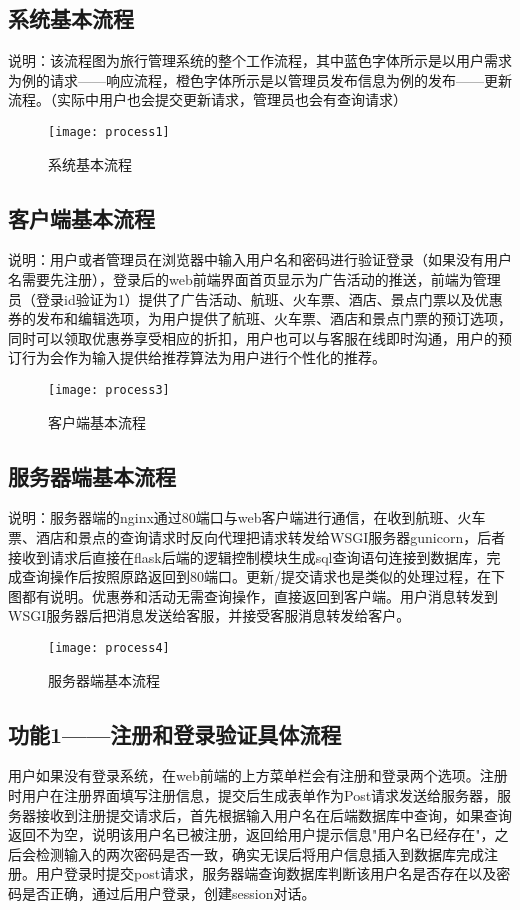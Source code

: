 \subsection{系统基本流程}
说明：该流程图为旅行管理系统的整个工作流程，其中蓝色字体所示是以用户需求为例的请求——响应流程，橙色字体所示是以管理员发布信息为例的发布——更新流程。（实际中用户也会提交更新请求，管理员也会有查询请求）
\newpage

\begin{figure}[htbp]
\texttt{[image: process1]}
\caption{系统基本流程} \label{fig:figure1}
\end{figure}

\subsection{客户端基本流程}
说明：用户或者管理员在浏览器中输入用户名和密码进行验证登录（如果没有用户名需要先注册），登录后的web前端界面首页显示为广告活动的推送，前端为管理员（登录id验证为1）提供了广告活动、航班、火车票、酒店、景点门票以及优惠券的发布和编辑选项，为用户提供了航班、火车票、酒店和景点门票的预订选项，同时可以领取优惠券享受相应的折扣，用户也可以与客服在线即时沟通，用户的预订行为会作为输入提供给推荐算法为用户进行个性化的推荐。
\begin{figure}[htbp]
\texttt{[image: process3]}
\caption{客户端基本流程} \label{fig:figure3}
\end{figure}

\subsection{服务器端基本流程}
说明：服务器端的nginx通过80端口与web客户端进行通信，在收到航班、火车票、酒店和景点的查询请求时反向代理把请求转发给WSGI服务器gunicorn，后者接收到请求后直接在flask后端的逻辑控制模块生成sql查询语句连接到数据库，完成查询操作后按照原路返回到80端口。更新/提交请求也是类似的处理过程，在下图都有说明。优惠券和活动无需查询操作，直接返回到客户端。用户消息转发到WSGI服务器后把消息发送给客服，并接受客服消息转发给客户。

\begin{figure}[htbp]
\texttt{[image: process4]}
\caption{服务器端基本流程} \label{fig:figure4}
\end{figure}

\subsection{功能1——注册和登录验证具体流程}
用户如果没有登录系统，在web前端的上方菜单栏会有注册和登录两个选项。注册时用户在注册界面填写注册信息，提交后生成表单作为Post请求发送给服务器，服务器接收到注册提交请求后，首先根据输入用户名在后端数据库中查询，如果查询返回不为空，说明该用户名已被注册，返回给用户提示信息"用户名已经存在"，之后会检测输入的两次密码是否一致，确实无误后将用户信息插入到数据库完成注册。用户登录时提交post请求，服务器端查询数据库判断该用户名是否存在以及密码是否正确，通过后用户登录，创建session对话。

